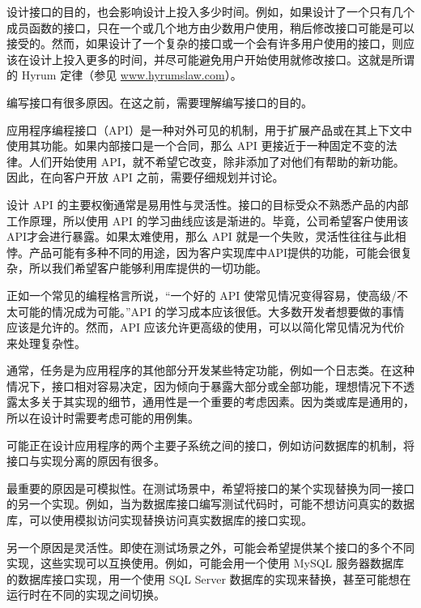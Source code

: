 设计接口的目的，也会影响设计上投入多少时间。例如，如果设计了一个只有几个成员函数的接口，只在一个或几个地方由少数用户使用，稍后修改接口可能是可以接受的。然而，如果设计了一个复杂的接口或一个会有许多用户使用的接口，则应该在设计上投入更多的时间，并尽可能避免用户开始使用就修改接口。这就是所谓的 Hyrum 定律（参见 \url{www.hyrumslaw.com}）。


编写接口有很多原因。在这之前，需要理解编写接口的目的。


应用程序编程接口（API）是一种对外可见的机制，用于扩展产品或在其上下文中使用其功能。如果内部接口是一个合同，那么 API 更接近于一种固定不变的法律。人们开始使用 API，就不希望它改变，除非添加了对他们有帮助的新功能。因此，在向客户开放 API 之前，需要仔细规划并讨论。

设计 API 的主要权衡通常是易用性与灵活性。接口的目标受众不熟悉产品的内部工作原理，所以使用 API 的学习曲线应该是渐进的。毕竟，公司希望客户使用该API才会进行暴露。如果太难使用，那么 API 就是一个失败，灵活性往往与此相悖。产品可能有多种不同的用途，因为客户实现库中API提供的功能，可能会很复杂，所以我们希望客户能够利用库提供的一切功能。

正如一个常见的编程格言所说，“一个好的 API 使常见情况变得容易，使高级/不太可能的情况成为可能。”API 的学习成本应该很低。大多数开发者想要做的事情应该是允许的。然而，API 应该允许更高级的使用，可以以简化常见情况为代价来处理复杂性。


通常，任务是为应用程序的其他部分开发某些特定功能，例如一个日志类。在这种情况下，接口相对容易决定，因为倾向于暴露大部分或全部功能，理想情况下不透露太多关于其实现的细节，通用性是一个重要的考虑因素。因为类或库是通用的，所以在设计时需要考虑可能的用例集。


可能正在设计应用程序的两个主要子系统之间的接口，例如访问数据库的机制，将接口与实现分离的原因有很多。

最重要的原因是可模拟性。在测试场景中，希望将接口的某个实现替换为同一接口的另一个实现。例如，当为数据库接口编写测试代码时，可能不想访问真实的数据库，可以使用模拟访问实现替换访问真实数据库的接口实现。

另一个原因是灵活性。即使在测试场景之外，可能会希望提供某个接口的多个不同实现，这些实现可以互换使用。例如，可能会用一个使用 MySQL 服务器数据库的数据库接口实现，用一个使用 SQL Server 数据库的实现来替换，甚至可能想在运行时在不同的实现之间切换。

